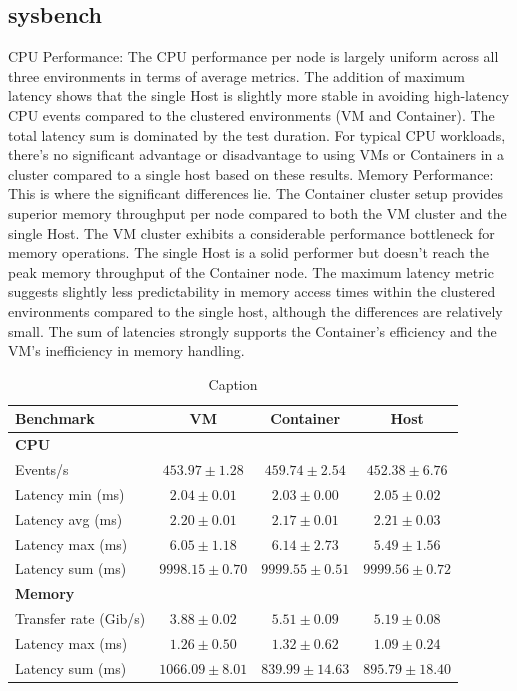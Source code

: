 \subsection{sysbench}
CPU Performance: The CPU performance per node is largely uniform across all three environments in terms of average metrics. The addition of maximum latency shows that the single Host is slightly more stable in avoiding high-latency CPU events compared to the clustered environments (VM and Container). The total latency sum is dominated by the test duration. For typical CPU workloads, there's no significant advantage or disadvantage to using VMs or Containers in a cluster compared to a single host based on these results.
Memory Performance: This is where the significant differences lie. The Container cluster setup provides superior memory throughput per node compared to both the VM cluster and the single Host. The VM cluster exhibits a considerable performance bottleneck for memory operations. The single Host is a solid performer but doesn't reach the peak memory throughput of the Container node. The maximum latency metric suggests slightly less predictability in memory access times within the clustered environments compared to the single host, although the differences are relatively small. The sum of latencies strongly supports the Container's efficiency and the VM's inefficiency in memory handling.

\begin{table}[H]
    \centering
    \begin{tabular}{lccc}
    \toprule
    \textbf{Benchmark} & \textbf{VM} & \textbf{Container} & \textbf{Host} \\
    \midrule
    \textbf{CPU} & & & \\
    Events/s & $453.97 \pm 1.28$ & $459.74 \pm 2.54$ & $452.38 \pm 6.76$ \\
    Latency min (ms) & $2.04 \pm 0.01$ & $2.03 \pm 0.00$ & $2.05 \pm 0.02$ \\
    Latency avg (ms) & $2.20 \pm 0.01$ & $2.17 \pm 0.01$ & $2.21 \pm 0.03$ \\
    Latency max (ms) & $6.05 \pm 1.18$ & $6.14 \pm 2.73$ & $5.49 \pm 1.56$ \\
    Latency sum (ms) & $9998.15 \pm 0.70$ & $9999.55 \pm 0.51$ & $9999.56 \pm 0.72$ \\
    \midrule
    \textbf{Memory} & & & \\
    Transfer rate (Gib/s) & $3.88 \pm 0.02$ & $5.51 \pm 0.09$ & $5.19 \pm 0.08$ \\
    Latency max (ms) & $1.26 \pm 0.50$ & $1.32 \pm 0.62$ & $1.09 \pm 0.24$ \\
    Latency sum (ms) & $1066.09 \pm 8.01$ & $839.99 \pm 14.63$ & $895.79 \pm 18.40$ \\
    \bottomrule

    \end{tabular}
    \caption{Caption}
    \label{tab:my_label}
\end{table}


